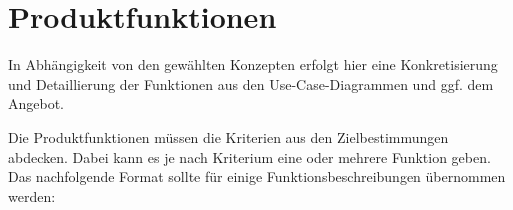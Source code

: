 

\chapter{Produktfunktionen}
\label{chap:product_functions}

\iffalse
In Abhängigkeit von den gewählten Konzepten erfolgt hier eine Konkretisierung
und Detaillierung der Funktionen aus den Use-Case-Diagrammen und ggf. dem
Angebot.

Die Produktfunktionen müssen die Kriterien aus den Zielbestimmungen abdecken.
Dabei kann es je nach Kriterium eine oder mehrere Funktion geben.
Das nachfolgende Format sollte für einige Funktionsbeschreibungen übernommen werden:

